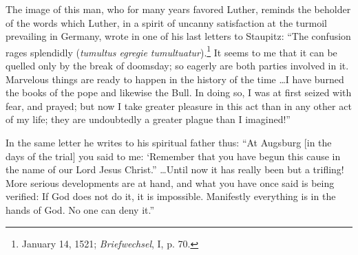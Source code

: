 The image of this man, who for many years favored Luther, reminds
the beholder of the words which Luther, in a spirit of uncanny
satisfaction at the turmoil prevailing in Germany, wrote in one of his
last letters to Staupitz: “The confusion rages splendidly (\textit{tumultus
egregie tumultuatur}).\footnote{January 14, 1521; \textit{Briefwechsel}, I, p. 70.}
It seems to me that it can be quelled only
by the break of doomsday; so eagerly are both parties involved in it.
Marvelous things are ready to happen in the history of the time \dots I
have burned the books of the pope and likewise the Bull. In doing
so, I was at first seized with fear, and prayed; but now I take greater
pleasure in this act than in any other act of my life; they are undoubtedly
a greater plague than I imagined!”

In the same letter he writes to his spiritual father thus: “At Augsburg
[in the days of the trial] you said to me: ‘Remember that you
have begun this cause in the name of our Lord Jesus Christ.” \dots Until
now it has really been but a trifling! More serious developments are
at hand, and what you have once said is being verified: If God does
not do it, it is impossible. Manifestly everything is in the hands of
God. No one can deny it.”
